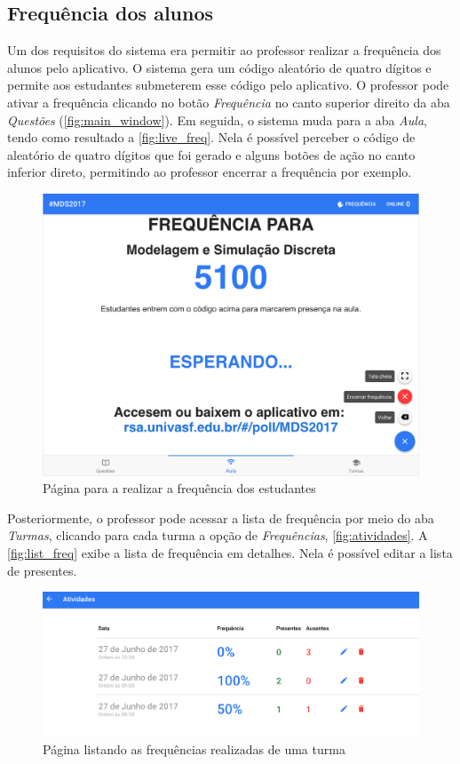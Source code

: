 \subsection{Frequência dos alunos}
\label{sec:freq_students}

Um dos requisitos do sistema era permitir ao professor realizar a frequência dos alunos
pelo aplicativo. O sistema gera um código aleatório de quatro dígitos e permite aos estudantes
submeterem esse código pelo aplicativo. O professor pode ativar a frequência
clicando no botão \textit{Frequência} no canto superior direito da aba \textit{Questões} (\autoref{fig:main_window}).
Em seguida, o sistema muda para a aba \textit{Aula}, tendo como resultado a \autoref{fig:live_freq}.
Nela é possível perceber o código de aleatório de quatro dígitos que foi gerado e alguns botões de ação no canto
inferior direto, permitindo ao professor encerrar a frequência por exemplo.

\begin{figure}[ht]
  \centering
  \caption{Página para a realizar a frequência dos estudantes}
  \label{fig:live_freq}
  \includegraphics[scale=.30]{imagens/telas/live_freq}
  \doautor
\end{figure}

Posteriormente, o professor pode acessar a lista de frequência por meio do aba \textit{Turmas},
clicando para cada turma a opção de \textit{Frequências}, \autoref{fig:atividades}. A \autoref{fig:list_freq} exibe a
lista de frequência em detalhes. Nela é possível editar a lista de presentes.

\begin{figure}[ht]
  \centering
  \caption{Página listando as frequências realizadas de uma turma}
  \label{fig:atividades}
  \includegraphics[scale=.35]{imagens/telas/atividades}
  \doautor
\end{figure}

